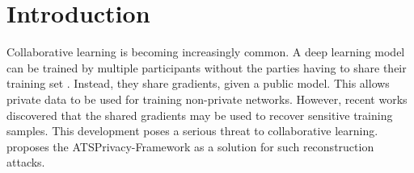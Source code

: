 



\clearpage


\newpage
\section{Introduction}
Collaborative learning is becoming increasingly common. A deep learning model can be trained by multiple participants without the parties having to share their training set  \cite{yang2019federated, guo2020towards, melis2019exploiting}. Instead, they share gradients, given a public model. This allows private data to be used for training non-private networks. However, recent works discovered that the shared gradients may be used to recover sensitive training samples. This development poses a serious threat to collaborative learning. \citeauthor{gao2021privacy}\cite{gao2021privacy} proposes the ATSPrivacy-Framework as a solution for such reconstruction attacks.

